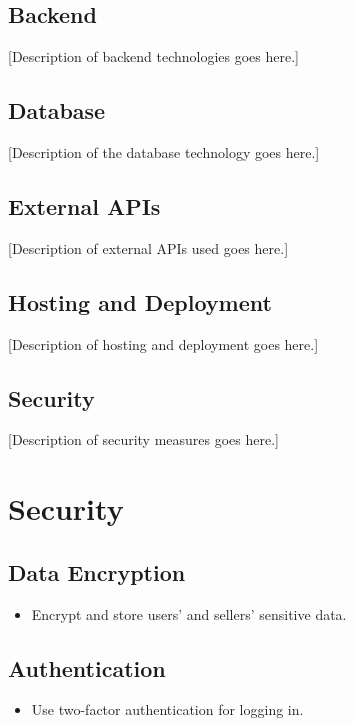 \documentclass{article}
\begin{document}
\subsection{Backend}
[Description of backend technologies goes here.]

\subsection{Database}
[Description of the database technology goes here.]

\subsection{External APIs}
[Description of external APIs used goes here.]

\subsection{Hosting and Deployment}
[Description of hosting and deployment goes here.]

\subsection{Security}
[Description of security measures goes here.]

\section{Security}

\subsection{Data Encryption}
\begin{itemize}
  \item Encrypt and store users' and sellers' sensitive data.
\end{itemize}

\subsection{Authentication}
\begin{itemize}
  \item Use two-factor authentication for logging in.
\end{itemize}
\end{document}
